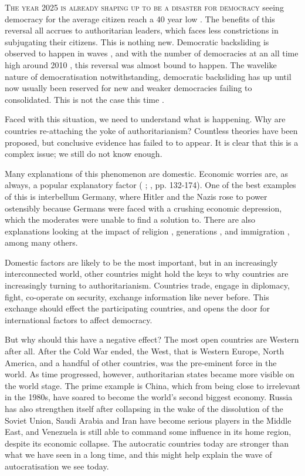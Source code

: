\lettrine{T}{he year 2025 is already shaping up to be a disaster for democracy} seeing democracy for the average citizen reach a 40 year low \citep[p. 9]{nord_democracy_2025}. The benefits of this reversal all accrues to authoritarian leaders, which faces less constrictions in subjugating their citizens. This is nothing new. Democratic backsliding is observed to happen in waves \citep{huntington_third_1991}, and with the number of democracies at an all time high around 2010 \citep[pp. 10-11]{nord_democracy_2025}, this reversal was almost bound to happen. The wavelike nature of democratisation notwithstanding, democratic backsliding has up until now usually been reserved for new and weaker democracies failing to consolidated. This is not the case this time \citep{nord_democracy_2025}. 

Faced with this situation, we need to understand what is happening. Why are countries re-attaching the yoke of authoritarianism? Countless theories have been proposed, but conclusive evidence has failed to to appear. It is clear that this is a complex issue; we still do not know enough.

Many explanations of this phenomenon are domestic. Economic worries are, as always, a popular explanatory factor (\citeauthor{lipset_chapter_1960} \citeyear{lipset_chapter_1960}; \citeauthor{norris_cultural_2019} \citeyear{norris_cultural_2019}, pp. 132-174). One of the best examples of this is interbellum Germany, where Hitler and the Nazis rose to power ostensibly because Germans were faced with a crushing economic depression, which the moderates were unable to find a solution to. There are also explanations looking at the impact of religion \citep{huntington_third_1991}, generations \citep{norris_cultural_2019}, and immigration \citep[pp. 175-212]{norris_cultural_2019}, among many others.

Domestic factors are likely to be the most important, but in an increasingly interconnected world, other countries might hold the keys to why countries are increasingly turning to authoritarianism. Countries trade, engage in diplomacy, fight, co-operate on security, exchange information like never before. This exchange should effect the participating countries, and opens the door for international factors to affect democracy.

But why should this have a negative effect? The most open countries are Western after all. After the Cold War ended, the West, that is Western Europe, North America, and a handful of other countries, was the pre-eminent force in the world. As time progressed, however, authoritarian states became more visible on the world stage. The prime example is China, which from being close to irrelevant in the 1980s, have soared to become the world's second biggest economy. Russia has also strengthen itself after collapsing in the wake of the dissolution of the Soviet Union,  Saudi Arabia and Iran have become serious players in the Middle East, and Venezuela is still able to command some influence in its home region, despite its economic collapse. The autocratic countries today are stronger than what we have seen in a long time, and this might help explain the wave of autocratisation we see today.


